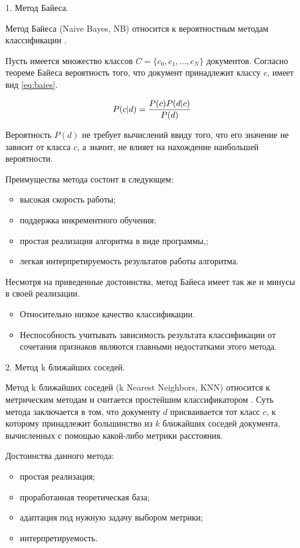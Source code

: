 \begin{enumerate}
\item[1.] Метод Байеса.

Метод Байеса (Naive Bayes, NB) относится к вероятностным методам классификации \cite{baes}. 

Пусть имеется множество классов $C = \{c_0, c_1, ..., c_N\}$ документов. Согласно теореме Байеса вероятность того, что документ принадлежит классу $c$, имеет вид \ref{eq:baies}.

\begin{equation}
	\centering
	P(c|d)=\frac{P(c)P(d|c)}{P(d)}
	\label{eq:baies}
\end{equation}

Вероятность $P(d)$ не требует вычислений ввиду того, что его значение не зависит от класса $c$, а значит, не влияет на нахождение наибольшей вероятности. 

Преимущества метода состоит в следующем: 
\begin{itemize}
\item высокая скорость работы;
\item поддержка инкрементного обучения;
\item простая реализация алгоритма в виде программы,;
\item легкая интерпретируемость результатов работы алгоритма. 
\end{itemize}

Несмотря на приведенные достоинства, метод Байеса имеет так же и минусы в своей реализации. 
\begin{itemize}
\item Относительно низкое качество классификации. 
\item Неспособность учитывать зависимость результата классификации от сочетания признаков являются главными недостатками этого метода.
\end{itemize}

\item[2.] Метод k ближайших соседей.

Метод k ближайших соседей (k Nearest Neighbors, KNN) относится к метрическим методам и считается простейшим классификатором \cite{neighbors}. Суть метода заключается в том, что документу $d$ присваивается тот класс $c$, к которому принадлежит большинство из $k$ ближайших соседей документа, вычисленных с помощью какой-либо метрики расстояния.

Достоинства данного метода: 
\begin{itemize}
\item простая реализация;
\item проработанная теоретическая база;
\item адаптация под нужную задачу выбором метрики;
\item интерпретируемость.
\end{itemize}


\end{enumerate}
